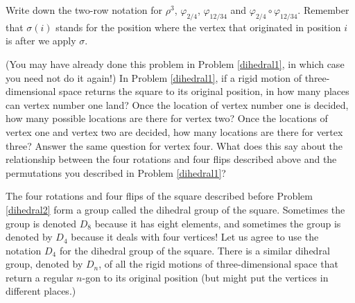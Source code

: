 \bp
\iteme Write down the two-row notation for $\rho^3$, $\varphi_{2/4}$,
$\varphi_{12/34}$ and $\varphi_{2/4}\circ \varphi_{12/34}$.  Remember that $\sigma(i)$
stands for the position where the vertex that originated in position $i$ is after we
apply $\sigma$.
\item (You may have already done this problem in Problem
\ref{dihedral1}, in which case you need not do it again!)  In Problem
\ref{dihedral1}, if a rigid motion of three-dimensional space returns the
square to its original position, in how many places can vertex number one
land?  Once the location of vertex number one is decided, how many
possible locations are there for vertex two?  Once the locations of
vertex one and vertex two are decided, how many locations are there for
vertex three?  Answer the same  question for vertex four.  What does this
say about the relationship between the four rotations and four flips
described above and the permutations you described in Problem
\ref{dihedral1}?\label{dihedral2}
\ep

The four rotations and four flips of the square described before Problem
\ref{dihedral2} form a group called the dihedral group of the square. 
Sometimes the group is denoted $D_8$ because it has eight elements, and
sometimes the group is denoted by $D_4$ because it deals with four
vertices!  Let us agree to use the notation $D_4$ for the dihedral group
of the square.  There is a similar dihedral group, denoted by $D_{n}$, of
all the rigid motions of three-dimensional space that return a regular
$n$-gon to its original position (but might put the vertices in different
places.) 


